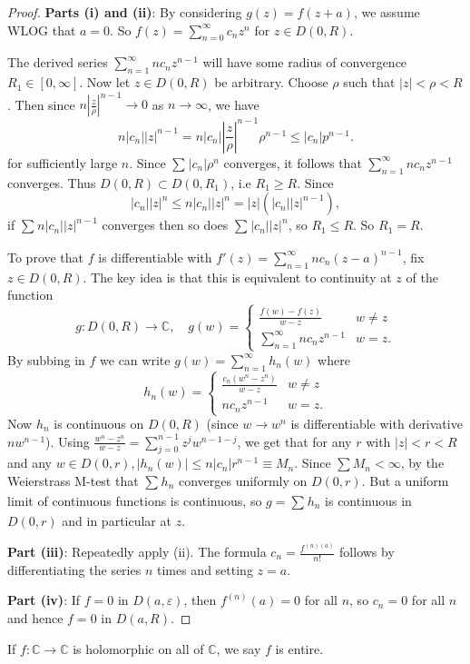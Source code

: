 \documentclass[a4paper]{scrartcl}
\begin{document}
\begin{proof}
      \textbf{Parts (i) and (ii)}: By considering $g (z)=f (z+a)$, we assume WLOG that $a=0$. So $f (z)=\sum_{n=0}^{ \infty}c_{n}z^{n}$ for $z \in D (0,R)$. 

     The derived series $\sum_{n=1}^{ \infty}nc_{n}z^{n-1}$ will have some radius of convergence $R_1 \in [0, \infty]$. Now let $z \in D (0,R)$ be arbitrary. Choose $\rho$ such that $|z|<\rho<R$. Then since $n |\frac{z}{\rho}|^{n-1} \rightarrow 0 $ as $n \rightarrow \infty$, we have \[
     n |c_n||z|^{n-1}=n |c_n||\frac{z}{\rho}|^{n-1}\rho^{n-1} \leq |c_n|p^{n-1}
     .\]  
     for sufficiently large $n$. Since $\sum_{}^{}|c_{n}|\rho^{n}$ converges, it follows that $\sum_{n=1}^{ \infty}nc_{n}z^{n-1}$ converges. Thus $D (0,R)\subset D (0,R_1 )$, i.e $R_1 \geq R$. Since \[
     |c_{n}||z|^{n} \leq n|c_{n}||z|^{n}=|z|\left(|c_{n}||z|^{n-1}\right)
     ,\] 
     if $\sum_{}^{}n |c_{n}||z|^{n-1}$ converges then so does $\sum_{}^{}|c_{n}||z|^{n}$, so $R_1 \leq R$. So $R_1 =R$. 
     
     To prove that $f$ is differentiable with $f' (z)=\sum_{n=1}^{ \infty}nc_{n}(z-a)^{n-1}$, fix $z \in D (0,R)$. The key idea is that this is equivalent to continuity at $z$ of the function 
     \begin{equation*}
          g: D (0,R) \rightarrow \mathbb{C}, \quad g (w)=
           \begin{cases}
                \frac{f (w)- f (z)}{w-z} & w \neq z\\
                \sum_{n=1}^{ \infty}nc_{n}z^{n-1} & w=z.
           \end{cases}          
     \end{equation*}
     By subbing in $f$ we can write $g (w)=\sum_{n=1}^{ \infty}h_{n}(w)$ where 
     \begin{equation*}
          h_{n} (w)=
          \begin{cases}
               \frac{c_{n}(w^{n}-z^{n})}{w-z} & w \neq z\\
               nc_{n}z^{n-1} & w=z.
          \end{cases}  
     \end{equation*}
     Now $h_{n}$ is continuous on $D (0,R)$ (since $w \rightarrow w^{n}$ is differentiable with derivative $nw^{n-1}$). Using $ \frac{w^{n}-z^{n}}{w-z}=\sum_{j=0}^{n-1}z^{j}w^{n-1-j}$, we get that for any $r$ with $|z|<r<R$ and any $w \in D (0,r), |h_{n}(w)|\leq n |c_{n}|r^{n-1} \equiv M_{n}$. Since $\sum M_{n} < \infty$, by the Weierstrass M-test that $\sum_{}^{}h_{n}$ converges uniformly on $D (0,r)$. But a uniform limit of continuous functions is continuous, so $g = \sum_{}^{}h_{n}$ is continuous in $D (0,r)$ and in particular at $z$.

     \textbf{Part (iii)}: Repeatedly apply (ii). The formula $c_{n}= \frac{f^{(n)(a)}}{n!}$ follows by differentiating the series $n$ times and setting $z=a$. 
     
     \textbf{Part (iv)}: If $f=0$ in $D (a, \varepsilon)$, then $f^{(n)}(a)=0$ for all $n$, so $c_{n}=0$ for all $n$ and hence $f=0$ in $D (a,R)$. 
\end{proof}
If $f: \mathbb{C} \rightarrow \mathbb{C}$ is holomorphic on all of $\mathbb{C}$, we say $f$ is entire. 
\end{document}
